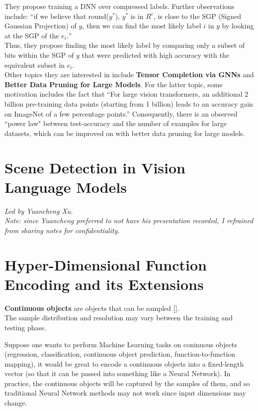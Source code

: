 \documentclass[12pt]{amsart}
\begin{document}
They propose training a DNN over compressed labels. Further observations include:
``if we believe that round($y^{\ast}$), $y^{\ast}$ is in $R^c$, is close to the SGP (Signed Gaussian Projection) of $y$, then we can find the most likely label $i$ in $y$ by looking at the SGP of the $e_i.$'' \\

Thus, they propose finding the most likely label by comparing only a subset of bits within the SGP of $y$ that were predicted with high accuracy with the equivalent subset in $e_i$. \\

Other topics they are interested in include \textbf{Tensor Completion via GNNs} and \textbf{Better Data Pruning for Large Models}. For the latter topic, some motivation includes the fact that ``For large vision transformers, an additional 2 billion pre-training data points (starting from 1 billion) leads to an accuracy gain on ImageNet of a few percentage points.'' 
Consequently, there is an observed ``power law" between test-accuracy and the number of examples for large datasets, which can be improved on with better data pruning for large models.

\section{Scene Detection in Vision Language Models}

\textit{Led by Yuancheng Xu.} \\

\textit{Note: since Yuancheng preferred to not have his presentation recorded, I refrained from sharing notes for confidentiality.}

\section{Hyper-Dimensional Function Encoding and its Extensions}

\begin{definition}
    \textbf{Continuous objects} are objects that can be sampled []. \\

    The sample distribution and resolution may vary between the training and testing phase.
\end{definition}

Suppose one wants to perform Machine Learning tasks on coninuous objects (regression, classification, continuous object prediction, function-to-function mapping), it would be great to encode a continuous objects into a fixed-length vector (so that it can be passed into something like a Neural Network).
In practice, the continuous objects will be captured by the samples of them, and so traditional Neural Network methods may not work since input dimensions may change. \\
\end{document}
